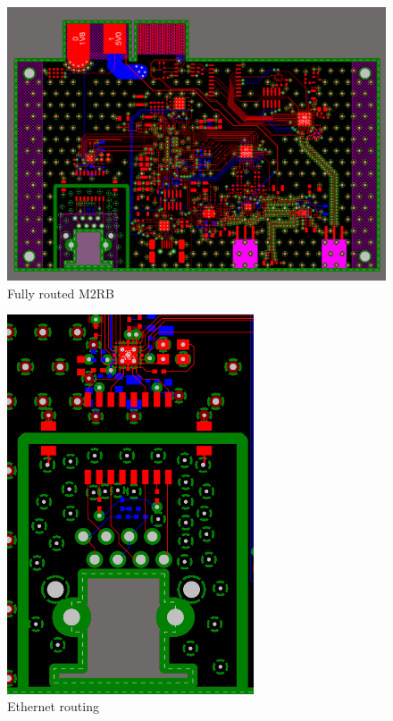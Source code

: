 \documentclass[crop=false]{standalone}
\begin{document}
        \begin{figure}[H]
            \centering
            \includegraphics[width=\textwidth]{M2RBPCB.PNG}
            \caption{Fully routed M2RB}
            \label{fig:M2RBPCB}
        \end{figure}
        
        \pagebreak
        
        \begin{figure}[H]
            \centering
            \includegraphics[width=0.65\textwidth,angle = 270]{M2RBEtherRoute.PNG}
            \caption{Ethernet routing}
            \label{fig:M2RBEtherRoute}
        \end{figure}
        
\end{document}
